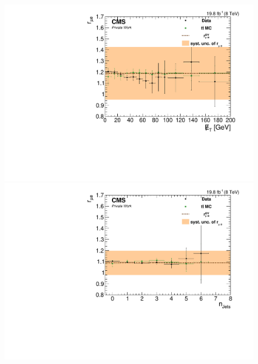\begin{figure}[htbp]
\begin{minipage}[t]{0.49\textwidth}
\end{minipage}
\begin{minipage}[t]{0.49\textwidth}
\includegraphics[width=\textwidth]{plots/BG/rmue/8TeVrRatioDataVsMCControl_met_Forward_Full2012.pdf}
\end{minipage}
\begin{minipage}[t]{0.49\textwidth}
  \includegraphics[width=\textwidth]{plots/BG/rmue/8TeVrRatioDataVsMCControl_nJets_Central_Full2012.pdf}
\end{minipage}
\begin{minipage}[t]{0.49\textwidth}

\end{minipage}
\end{figure}
